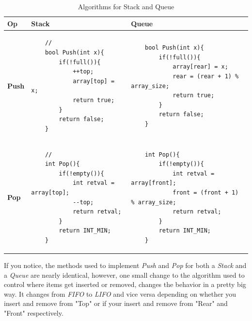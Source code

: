\begin{table}[H]
\begin{tabular}{|M{0.1\textwidth}|m{0.45\textwidth}|m{0.45\textwidth}|}
    \hline
    \textbf{Op} & \textbf{Stack} & \textbf{Queue} \\
    \hline
    
    \textbf{Push} 
    &
    \begin{minipage}[t]{0.5\textwidth}
    \begin{verbatim}
    //
    bool Push(int x){
        if(!full()){
            ++top;
            array[top] = x;
            return true;
        }
        return false;
    }
    \end{verbatim}
    \end{minipage}
    &
    \begin{minipage}[t]{0.5\textwidth}
    \begin{verbatim}
    bool Push(int x){
        if(!full()){
            array[rear] = x;
            rear = (rear + 1) % array_size;
            return true;
        }
        return false;
    }
    \end{verbatim}
    \end{minipage}\\
    \hline
    \textbf{Pop} 
    &
    \begin{minipage}[t]{0.5\textwidth}
    \begin{verbatim}
    //
    int Pop(){
        if(!empty()){
            int retval = array[top];
            --top;
            return retval;
        }
        return INT_MIN;
    }
    \end{verbatim}
    \end{minipage}
    &\begin{minipage}[t]{0.5\textwidth}
    \begin{verbatim}
    int Pop(){
        if(!empty()){
            int retval = array[front];
            front = (front + 1) % array_size;
            return retval;
        }
        return INT_MIN;
    }
    \end{verbatim}
    \end{minipage}\\
    \hline
\end{tabular}
\caption{Algorithms for Stack and Queue}
\label{table:stackvqueue}
\end{table}

If you notice, the methods used to implement \textit{Push} and \textit{Pop} for both a \textit{Stack} and a \textit{Queue} are nearly identical, however, one small change to the algorithm used to control where items get inserted or removed, changes the behavior in a pretty big way. It changes from \textit{FIFO} to \textit{LIFO} and vice versa depending on whether you insert and remove from "Top" or if your insert and remove from "Rear" and "Front" respectively. \\


